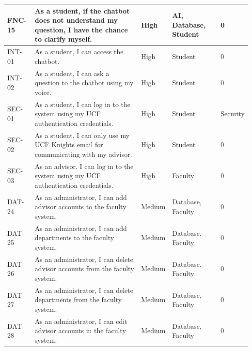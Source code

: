 \documentclass[titlepage, 12pt]{article}
\begin{document}
\begin{center}
\begin{longtable}{ L{1.5cm} L{4cm} L{1.5cm} L{3cm} L{1.5cm} }
        \midrule
        FNC-15 & As a student, if the chatbot does not understand my question, I have the chance to clarify myself.                                & High   & AI, Database, Student & 0  \\
        \midrule
        INT-01 & As a student, I can access the chatbot.                                                                                           & High   & Student             & 0     \\
        \midrule
        INT-02 & As a student, I can ask a question to the chatbot using my voice.                                                                 & High   & Student             & 0      \\
        \midrule
        SEC-01 & As a student, I can log in to the system using my UCF authentication credentials.                                                 & High   & Student             & Security       \\
        \midrule
        SEC-02 & As a student, I can only use my UCF Knights email for communicating with my advisor.                                              & High   & Student             & 0  \\
        \midrule
        SEC-03 & As an advisor, I can log in to the system using my UCF authentication credentials.                                                & High   & Faculty             & 0     \\
        \midrule
        DAT-24 & As an administrator, I can add advisor accounts to the faculty system.                                                            & Medium & Database, Faculty    & 0          \\
        \midrule
        DAT-25 & As an administrator, I can add departments to the faculty system.                                                                 & Medium & Database, Faculty    & 0             \\
        \midrule
        DAT-26 & As an administrator, I can delete advisor accounts from the faculty system.                                                       & Medium & Database, Faculty    & 0              \\
        \midrule
        DAT-27 & As an administrator, I can delete departments from the faculty system.                                                            & Medium & Database, Faculty    & 0              \\
        \midrule
        DAT-28 & As an administrator, I can edit advisor accounts in the faculty system.                                                           & Medium & Database, Faculty    & 0              \\

\end{longtable}
\end{center}
\end{document}
